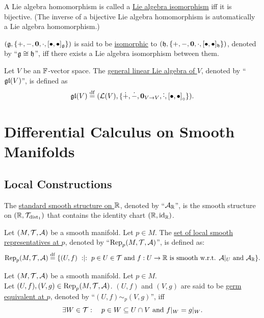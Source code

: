\documentclass[11pt,reqno]{amsart}
\newcommand{\Rep}{\mathrm{Rep}}
\newcommand{\pwplus}{\mathbin{\dot{+}}}
\newcommand{\pwminus}{\mathbin{\dot{-}}}
\newcommand{\pwcdot}{\mathbin{\dot{\cdot}}}
\begin{document}
\begin{Def}
A Lie algebra homomorphism is called a
\ul{Lie algebra isomorphism} iff it is bijective.
(The inverse of a bijective Lie algebra homomorphism is automatically
a Lie algebra homomorphism.)
\end{Def}

\begin{Def}
$\Br{\g,\set{+,-,\bm0,\cdot,[\bullet,\bullet]_\g}}$ is said to be
\ul{isomorphic} to $\Br{\h,\set{+,-,\bm0,\cdot,[\bullet,\bullet]_\h}}$,
denoted by ``$\mathfrak{g}\cong\mathfrak{h}$'', iff
there exists a Lie algebra isomorphism between them.
\end{Def}

\begin{Def}
Let $V$ be an $\mathbb{F}$-vector space. The
\ul{general linear Lie algebra of $V$},
denoted by ``$\mathfrak{gl}(V)$'', is defined as
\[\gl(V)\df\Br{\L(V),\set{\pwplus,\pwminus,\bm0_{V\to V},\pwcdot,\SqBr{\bullet,\bullet}_\circ}}.\]
\end{Def}

\section{Differential Calculus on Smooth Manifolds}\label{sec:diff-calc}
\subsection{Local Constructions}
\begin{Def}
The \ul{standard smooth structure on $\mathbb{R}$}, denoted by ``$\mathcal{A}_{\mathbb{R}}$'',
is the smooth structure on $(\mathbb{R},\mathcal{T}_{\mathrm{dist}_1})$ that contains the identity chart $(\mathbb{R},\mathrm{id}_{\mathbb{R}})$.
\end{Def}

\begin{Def}
Let $(M,\mathcal{T},\mathcal{A})$ be a smooth manifold. Let $p\in M$.
The \ul{set of local smooth representatives at $p$},
denoted by ``$\Rep_p(M,\T,\A)$'', is defined as:
\[
\Rep_p(M,\T,\A)\df
\set{(U,f)\st p\in U\in\T\tand f:U\to\R~\text{is smooth
w.r.t. $\A|_U$ and $\A_\R$}}.
\]
\end{Def}

\begin{Def}
Let $(M,\mathcal{T},\mathcal{A})$ be a smooth manifold. Let $p\in M$.\\
Let $(U,f),(V,g)\in\Rep_p(M,\T,\A)$.
$(U,f)$ and $(V,g)$ are said to be \ul{germ equivalent at $p$}, denoted by
``$(U,f)\sim_p(V,g)$'', iff
\[
\exists W\in\mathcal{T}:\quad p\in W\subseteq U\cap V~\mathrm{and}~ f|_W=g|_W.
\]
\end{Def}
\end{document}

